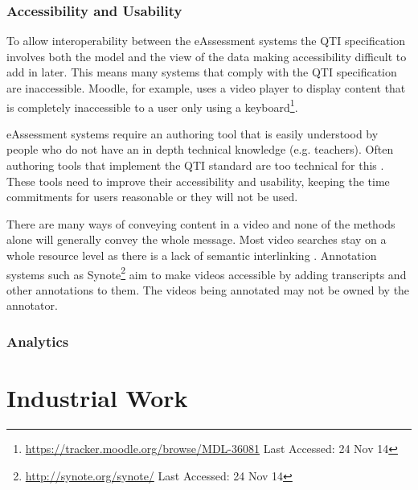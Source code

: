 \subsubsection{Accessibility and Usability}
\label{Subsubsection:Accessibility and Usability}
To allow interoperability between the eAssessment systems the QTI specification involves both the model and the view of the data \citep{wikieassessment} making accessibility difficult to add in later. This means many systems that comply with the QTI specification are inaccessible. Moodle, for example, uses a video player to display content that is completely inaccessible to a user only using a keyboard\footnote{\url{https://tracker.moodle.org/browse/MDL-36081} Last Accessed: 24 Nov 14}.

eAssessment systems require an authoring tool that is easily understood by people who do not have an in depth technical knowledge (e.g. teachers). Often authoring tools that implement the QTI standard are too technical for this \citep{wikieassessment}. These tools need to improve their accessibility and usability, keeping the time commitments for users reasonable \citep{eps271236, eps265979} or they will not be used.

There are many ways of conveying content in a video and none of the methods alone will generally convey the whole message. Most video searches stay on a whole resource level as there is a lack of semantic interlinking \citep{eps273063}. Annotation systems such as Synote\footnote{\url{http://synote.org/synote/} Last Accessed: 24 Nov 14} aim to make videos accessible by adding transcripts and other annotations to them. The videos being annotated may not be owned by the annotator.

\subsubsection{Analytics}
\label{Subsubsection:Analytics}



\newif\ifnote
\notefalse
\ifnote
In \cite{eps265979}:
R2Q2 (deprecated - replaced by QTI Engine)
Constructr - constructr.qtitools.org - proof-of-concept
Playr - playr.qtitools.org - deprecated - effectively our overlays
\fi

\section{Industrial Work} 
\label{Section:Industrial Work}